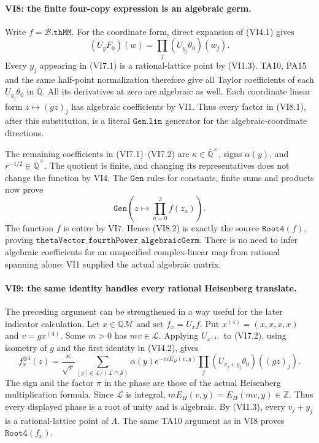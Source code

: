 \paragraph{VI8: the finite four-copy expression is an algebraic germ.}
Write \(f=\mathscr B.\texttt{thMM}\). For the coordinate form,
direct expansion of (VI4.1) gives
\[
                 (U_yF_0)(w)
                    =\prod_j (U_{y_j}\theta_0)(w_j).
 \tag{VI8.1}
\]
Every \(y_j\) appearing in (VI7.1) is a rational-lattice
point by (VI1.3). TA10, PA15 and the same half-point
normalization therefore give all Taylor coefficients of
each \(U_{y_j}\theta_0\) in \(\overline{\mathbb Q}\).
All its derivatives at zero are algebraic as well.
Each coordinate linear form \(z\mapsto(gz)_j\) has algebraic
coefficients by VI1. Thus every factor in (VI8.1), after this
substitution, is a literal \(\texttt{Gen.lin}\) generator for
the algebraic-coordinate directions.

The remaining coefficients in (VI7.1)--(VI7.2) are
\(\kappa\in\overline{\mathbb Q}^{\times}\), signs
\(\alpha(y)\), and \(r^{-1/2}\in\overline{\mathbb Q}^{\times}\).
The quotient is finite, and changing its representatives does
not change the function by VI4. The \(\texttt{Gen}\) rules for
constants, finite sums and products now prove
\[
 \texttt{Gen}\left(z\longmapsto\prod_{a=0}^3 f(z_a)\right).
 \tag{VI8.2}
\]
The function \(f\) is entire by VI7. Hence (VI8.2) is exactly
the source \(\texttt{Root4}(f)\), proving
\(\texttt{thetaVector\_fourthPower\_algebraicGerm}\).
There is no need to infer algebraic coefficients for an
unspecified complex-linear map from rational spanning alone:
VI1 supplied the actual algebraic matrix.

\paragraph{VI9: the same identity handles every rational Heisenberg translate.}
The preceding argument can be strengthened in a way useful for
the later indicator calculation. Let \(x\in\mathbb Q\mathcal M\)
and set \(f_x=U_xf\). Put \(x^{(4)}=(x,x,x,x)\) and
\(v=gx^{(4)}\). Some \(m>0\) has \(mv\in\mathcal L\).
Applying \(U_{x^{(4)}}\) to (VI7.2), using isometry of \(g\)
and the first identity in (VI4.2), gives
\[
 f_x^{\otimes4}(z)=
 \frac{\kappa}{\sqrt r}
 \sum_{[y]\in\mathcal L/(\mathcal L\cap\mathcal S)}
  \alpha(y)e^{-\pi iE_H(v,y)}
       \prod_j (U_{v_j+y_j}\theta_0)((gz)_j).
 \tag{VI9.1}
\]
The sign and the factor \(\pi\) in the phase are those of
the actual Heisenberg multiplication formula.
Since \(\mathcal L\) is integral,
\(mE_H(v,y)=E_H(mv,y)\in\mathbb Z\). Thus every displayed
phase is a root of unity and is algebraic. By (VI1.3),
every \(v_j+y_j\) is a rational-lattice point of \(\Lambda\).
The same TA10 argument as in VI8 proves
\(\texttt{Root4}(f_x)\).

